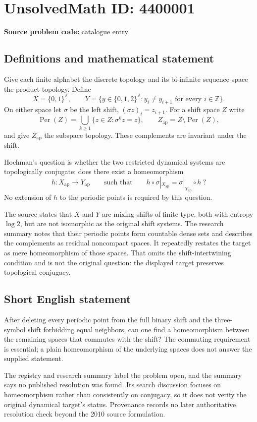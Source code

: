 \documentclass[11pt]{article}
\newcommand{\Z}{\mathbb{Z}}
\begin{document}
\section*{UnsolvedMath ID: 4400001}
\textbf{Source problem code:} catalogue entry
\subsection{Definitions and mathematical statement}
Give each finite alphabet the discrete topology and its bi-infinite sequence space the product topology. Define
\[
 X=\{0,1\}^{\Z},\qquad
 Y=\{y\in\{0,1,2\}^{\Z}:y_i\ne y_{i+1}\text{ for every }i\in\Z\}.
\]
On either space let $\sigma$ be the left shift, $(\sigma z)_i=z_{i+1}$. For a shift space $Z$ write
\[
 \operatorname{Per}(Z)=\bigcup_{k\ge1}\{z\in Z:\sigma^kz=z\},
 \qquad Z_{\mathrm{ap}}=Z\setminus\operatorname{Per}(Z),
\]
and give $Z_{\mathrm{ap}}$ the subspace topology. These complements are invariant under the shift.

Hochman's question is whether the two restricted dynamical systems are topologically conjugate: does there exist a homeomorphism
\[
 h:X_{\mathrm{ap}}\longrightarrow Y_{\mathrm{ap}}
 \qquad\text{such that}\qquad
 h\circ\sigma|_{X_{\mathrm{ap}}}=\sigma|_{Y_{\mathrm{ap}}}\circ h\ ?
\]
No extension of $h$ to the periodic points is required by this question.

The source states that $X$ and $Y$ are mixing shifts of finite type, both with entropy $\log2$, but are not isomorphic as the original shift systems. The research summary notes that their periodic points form countable dense sets and describes the complements as residual noncompact spaces. It repeatedly restates the target as mere homeomorphism of those spaces. That omits the shift-intertwining condition and is not the original question: the displayed target preserves topological conjugacy.
\subsection{Short English statement}
After deleting every periodic point from the full binary shift and the three-symbol shift forbidding equal neighbors, can one find a homeomorphism between the remaining spaces that commutes with the shift? The commuting requirement is essential; a plain homeomorphism of the underlying spaces does not answer the supplied statement.

The registry and research summary label the problem open, and the summary says no published resolution was found. Its search discussion focuses on homeomorphism rather than consistently on conjugacy, so it does not verify the original dynamical target's status. Provenance records no later authoritative resolution check beyond the 2010 source formulation.
\end{document}
